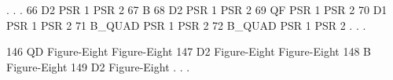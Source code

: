 {{ 
\begin{ptccode}
     .
     .
     .
  66 D2              
PSR 1                                                                                                                   
PSR 2                                                                                                                   
  67 B           \label{lin:b:nil}     
  68 D2             
PSR 1                                                                                                                   
PSR 2                                                                                                                   
  69 QF         \label{lin:qf:psr}      
PSR 1                                                                                                                   
PSR 2                                                                                                                   
  70 D1              
PSR 1                                                                                                                   
PSR 2                                                                                                                   
  71 B_QUAD      \label{lin:b:q}         
PSR 1                                                                                                                   
PSR 2                                                                                                                   
  72 B_QUAD          
PSR 1                                                                                                                   
PSR 2                                                                                                                   
     .
     .
     .

 146 QD           \label{lin:qd:8}        
Figure-Eight                                                                                                            
Figure-Eight                                                                                                            
 147 D2              
Figure-Eight                                                                                                            
Figure-Eight                                                                                                            
 148 B               
Figure-Eight                                                                                                            
 149 D2              
Figure-Eight                                                                                                            
     .
     .
     .
\end{ptccode}
}


}
